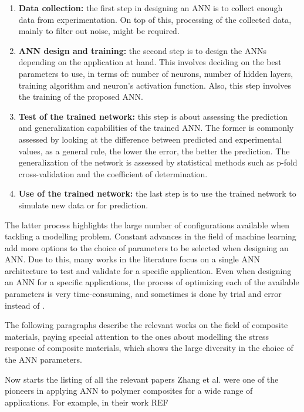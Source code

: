 \begin{enumerate}
    \item \textbf{Data collection:} the first step in designing an ANN is to collect enough data from experimentation. On top of this, processing of the collected data, mainly to filter out noise, might be required.
    \item \textbf{ANN design and training:} the second step is to design the ANNs depending on the application at hand. This involves deciding on the best parameters to use, in terms of: number of neurons, number of hidden layers, training algorithm and neuron's activation function. Also, this step involves the training of the proposed ANN.
    \item \textbf{Test of the trained network:} this step is about assessing the prediction and generalization capabilities of the trained ANN. The former is commonly assessed by looking at the difference between predicted and experimental values, as a general rule, the lower the error, the better the prediction. The generalization of the network is assessed by statistical methods such as p-fold cross-validation and the coefficient of determination.
    \item \textbf{Use of the trained network:} the last step is to use the trained network to simulate new data or for prediction.
\end{enumerate}

The latter process highlights the large number of configurations available when tackling a modelling problem. Constant advances in the field of machine learning add more options to the choice of parameters to be selected when designing an ANN. Due to this, many works in the literature focus on a single ANN architecture to test and validate for a specific application. Even when designing an ANN for a specific applications, the process of optimizing each of the available parameters is very time-consuming, and sometimes is done by trial and error instead of . 


The following paragraphs describe the relevant works on the field of composite materials, paying special attention to the ones about modelling the stress response of composite materials, which shows the large diversity in the choice of the ANN parameters.

{ \Huge Now starts the listing of all the relevant papers }
Zhang et al. were one of the pioneers in applying ANN to polymer composites for a wide range of applications. For example, in their work REF

